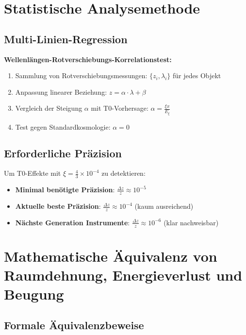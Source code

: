 \documentclass[12pt,a4paper]{article}
\newcommand{\xiconst}{\xi = \frac{4}{3} \times 10^{-4}}
\newcommand{\Exi}{E_\xi}
\theoremstyle{definition}
\begin{document}
	\section{Statistische Analysemethode}
	
	\subsection{Multi-Linien-Regression}
	
	\begin{experiment}
		\textbf{Wellenl\"angen-Rotverschiebungs-Korrelationstest:}
		\begin{enumerate}
			\item Sammlung von Rotverschiebungsmessungen: $\{z_i, \lambda_i\}$ f\"ur jedes Objekt
			\item Anpassung linearer Beziehung: $z = \alpha \cdot \lambda + \beta$
			\item Vergleich der Steigung $\alpha$ mit T0-Vorhersage: $\alpha = \frac{\xi x}{\Exi}$
			\item Test gegen Standardkosmologie: $\alpha = 0$
		\end{enumerate}
	\end{experiment}
	
	\subsection{Erforderliche Pr\"azision}
	
	Um T0-Effekte mit $\xiconst$ zu detektieren:
	\begin{itemize}
		\item \textbf{Minimal ben\"otigte Pr\"azision}: $\frac{\Delta z}{z} \approx 10^{-5}$
		\item \textbf{Aktuelle beste Pr\"azision}: $\frac{\Delta z}{z} \approx 10^{-4}$ (kaum ausreichend)
		\item \textbf{N\"achste Generation Instrumente}: $\frac{\Delta z}{z} \approx 10^{-6}$ (klar nachweisbar)
	\end{itemize}
	
	\section{Mathematische \"Aquivalenz von Raumdehnung, Energieverlust und Beugung}
	\label{sec:equivalence}
	
	\subsection{Formale \"Aquivalenzbeweise}
	\label{subsec:equivalence_proofs}
	
\end{document}
